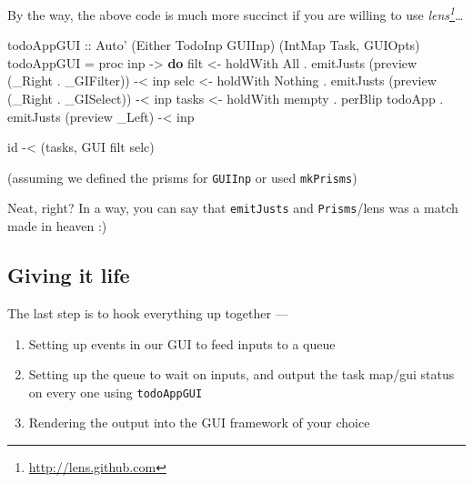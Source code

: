 \documentclass[]{article}
\newenvironment{Shaded}{}{}
\newcommand{\KeywordTok}[1]{\textcolor[rgb]{0.00,0.44,0.13}{\textbf{{#1}}}}
\newcommand{\DataTypeTok}[1]{\textcolor[rgb]{0.56,0.13,0.00}{{#1}}}
\newcommand{\OtherTok}[1]{\textcolor[rgb]{0.00,0.44,0.13}{{#1}}}
\newcommand{\FunctionTok}[1]{\textcolor[rgb]{0.02,0.16,0.49}{{#1}}}
\newcommand{\NormalTok}[1]{{#1}}
\renewcommand{\href}[2]{#2\footnote{\url{#1}}}
\begin{document}
By the way, the above code is much more succinct if you are willing to
use \emph{\href{http://lens.github.com}{lens}}\ldots{}

\begin{Shaded}
\begin{Highlighting}[]
\OtherTok{todoAppGUI ::} \DataTypeTok{Auto'} \NormalTok{(}\DataTypeTok{Either} \DataTypeTok{TodoInp} \DataTypeTok{GUIInp}\NormalTok{) (}\DataTypeTok{IntMap} \DataTypeTok{Task}\NormalTok{, }\DataTypeTok{GUIOpts}\NormalTok{)}
\NormalTok{todoAppGUI }\FunctionTok{=} \NormalTok{proc inp }\OtherTok{->} \KeywordTok{do}
    \NormalTok{filt  }\OtherTok{<-} \NormalTok{holdWith }\DataTypeTok{All}
           \FunctionTok{.} \NormalTok{emitJusts (preview (_}\DataTypeTok{Right} \FunctionTok{.} \NormalTok{_}\DataTypeTok{GIFilter}\NormalTok{)) }\FunctionTok{-<} \NormalTok{inp}
    \NormalTok{selc  }\OtherTok{<-} \NormalTok{holdWith }\DataTypeTok{Nothing}
           \FunctionTok{.} \NormalTok{emitJusts (preview (_}\DataTypeTok{Right} \FunctionTok{.} \NormalTok{_}\DataTypeTok{GISelect}\NormalTok{)) }\FunctionTok{-<} \NormalTok{inp}
    \NormalTok{tasks }\OtherTok{<-} \NormalTok{holdWith mempty }\FunctionTok{.} \NormalTok{perBlip todoApp}
           \FunctionTok{.} \NormalTok{emitJusts (preview _}\DataTypeTok{Left}\NormalTok{)                }\FunctionTok{-<} \NormalTok{inp}

    \NormalTok{id }\FunctionTok{-<} \NormalTok{(tasks, }\DataTypeTok{GUI} \NormalTok{filt selc)}
\end{Highlighting}
\end{Shaded}

(assuming we defined the prisms for \texttt{GUIInp} or used
\texttt{\textquotesingle{}\textquotesingle{}mkPrisms})

Neat, right? In a way, you can say that \texttt{emitJusts} and
\texttt{Prisms}/lens was a match made in heaven :)

\subsection{Giving it life}\label{giving-it-life}

The last step is to hook everything up together ---

\begin{enumerate}
\def\labelenumi{\arabic{enumi}.}
\tightlist
\item
  Setting up events in our GUI to feed inputs to a queue
\item
  Setting up the queue to wait on inputs, and output the task map/gui
  status on every one using \texttt{todoAppGUI}
\item
  Rendering the output into the GUI framework of your choice
\end{enumerate}
\end{document}
